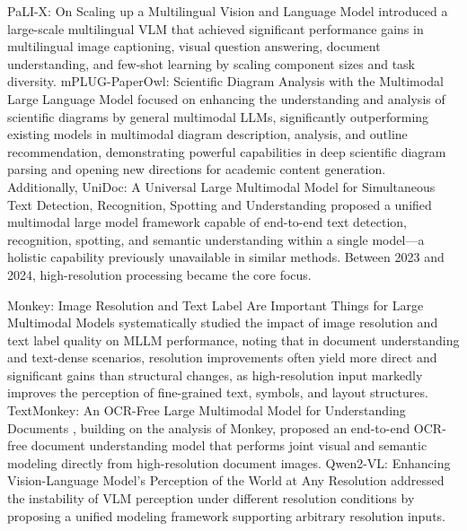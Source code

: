PaLI-X: On Scaling up a Multilingual Vision and Language Model \cite{chen2023palix} introduced a large-scale multilingual VLM that achieved significant performance gains in multilingual image captioning, visual question answering, document understanding, and few-shot learning by scaling component sizes and task diversity.
mPLUG-PaperOwl: Scientific Diagram Analysis with the Multimodal Large Language Model \cite{ye2023paperowl} focused on enhancing the understanding and analysis of scientific diagrams by general multimodal LLMs, significantly outperforming existing models in multimodal diagram description, analysis, and outline recommendation, demonstrating powerful capabilities in deep scientific diagram parsing and opening new directions for academic content generation. Additionally, UniDoc: A Universal Large Multimodal Model for Simultaneous Text Detection, Recognition, Spotting and Understanding \cite{li2023unidoc} proposed a unified multimodal large model framework capable of end-to-end text detection, recognition, spotting, and semantic understanding within a single model---a holistic capability previously unavailable in similar methods. Between 2023 and 2024, high-resolution processing became the core focus.

Monkey: Image Resolution and Text Label Are Important Things for Large Multimodal Models \cite{li2024monkey} systematically studied the impact of image resolution and text label quality on MLLM performance, noting that in document understanding and text-dense scenarios, resolution improvements often yield more direct and significant gains than structural changes, as high-resolution input markedly improves the perception of fine-grained text, symbols, and layout structures. TextMonkey: An OCR-Free Large Multimodal Model for Understanding Documents \cite{li2024textmonkey}, building on the analysis of Monkey, proposed an end-to-end OCR-free document understanding model that performs joint visual and semantic modeling directly from high-resolution document images. Qwen2-VL: Enhancing Vision-Language Model's Perception of the World at Any Resolution \cite{wang2024qwen2vl} addressed the instability of VLM perception under different resolution conditions by proposing a unified modeling framework supporting arbitrary resolution inputs.

